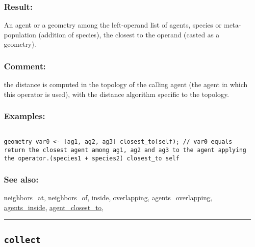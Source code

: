 \documentclass[]{book}
\theoremstyle{definition}
\theoremstyle{definition}
\theoremstyle{definition}
\theoremstyle{remark}
\begin{document}
\subsubsection{Result:}\label{result-87}

An agent or a geometry among the left-operand list of agents, species or
meta-population (addition of species), the closest to the operand
(casted as a geometry).

\subsubsection{Comment:}\label{comment-20}

the distance is computed in the topology of the calling agent (the agent
in which this operator is used), with the distance algorithm specific to
the topology.

\subsubsection{Examples:}\label{examples-68}

\begin{verbatim}
 
geometry var0 <- [ag1, ag2, ag3] closest_to(self); // var0 equals return the closest agent among ag1, ag2 and ag3 to the agent applying the operator.(species1 + species2) closest_to self 
\end{verbatim}

\subsubsection{See also:}\label{see-also-54}

\href{OperatorsNR\#neighbors_at}{neighbors\_at},
\href{OperatorsNR\#neighbors_of}{neighbors\_of},
\href{OperatorsIM\#inside}{inside},
\href{OperatorsNR\#overlapping}{overlapping},
\href{OperatorsAA\#agents_overlapping}{agents\_overlapping},
\href{OperatorsAA\#agents_inside}{agents\_inside},
\href{OperatorsAA\#agent_closest_to}{agent\_closest\_to},

\begin{center}\rule{0.5\linewidth}{\linethickness}\end{center}

\subsection{\texorpdfstring{\texttt{collect}}{collect}}\label{collect}
\end{document}
